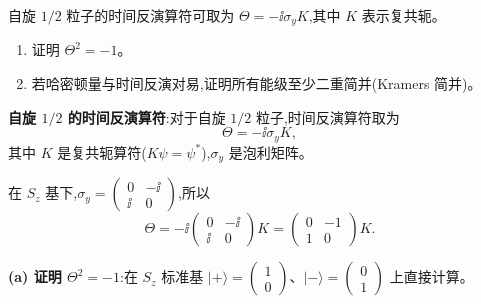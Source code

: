 \begin{question}
自旋 $1/2$ 粒子的时间反演算符可取为 $\Theta=-\ii\sigma_yK$,其中 $K$ 表示复共轭。
\begin{enumerate}
\item 证明 $\Theta^2=-1$。
\item 若哈密顿量与时间反演对易,证明所有能级至少二重简并(Kramers 简并)。
\end{enumerate}
\end{question}
\begin{solution}
	\textbf{自旋 $1/2$ 的时间反演算符}:对于自旋 $1/2$ 粒子,时间反演算符取为
	\[
	\Theta = -\ii\sigma_y K,
	\]
	其中 $K$ 是复共轭算符($K\psi=\psi^*$),$\sigma_y$ 是泡利矩阵。

	在 $S_z$ 基下,$\sigma_y = \begin{pmatrix}0&-\ii\\\ii&0\end{pmatrix}$,所以
	\[
	\Theta = -\ii\begin{pmatrix}0&-\ii\\\ii&0\end{pmatrix}K
	= \begin{pmatrix}0&-1\\1&0\end{pmatrix}K.
	\]

	\textbf{(a) 证明 $\Theta^2 = -1$}:在 $S_z$ 标准基 $|+\rangle=\begin{pmatrix}1\\0\end{pmatrix}$、$|-\rangle=\begin{pmatrix}0\\1\end{pmatrix}$ 上直接计算。


\end{solution}
